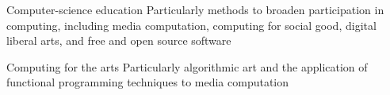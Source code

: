 
\begin{cventries}

  \cventryB
    {Computer-science education}{}{}
  \cventryNote
    {Particularly methods to broaden participation in computing, including
     media computation, computing for social good, digital liberal
     arts, and free and open source software}
    
  \cventryB
    {Computing for the arts}{}{}
  \cventryNote
    {Particularly algorithmic art and the application of functional 
     programming techniques to media computation}

\end{cventries}
